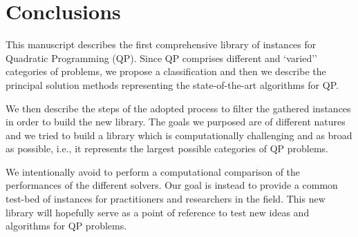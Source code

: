 \section{Conclusions}\label{sec:conclusions}

 This manuscript describes the first comprehensive library of instances for Quadratic Programming (QP). Since QP comprises  different and `varied'' categories of problems, we propose a classification and then we describe the principal solution methods representing the state-of-the-art algorithms for QP.

We then describe the steps of the adopted process  to filter the gathered instances  in order to build the new library. The goals we purposed are of different natures and we tried to build a library which is computationally challenging and as broad as possible, i.e., it represents the largest possible categories of QP problems. 

We intentionally avoid to perform a computational comparison of the performances of the different solvers. Our goal is instead to provide a common test-bed of instances for practitioners and researchers in the field. This new library will hopefully serve as a point of reference to test new ideas and algorithms for QP problems.
